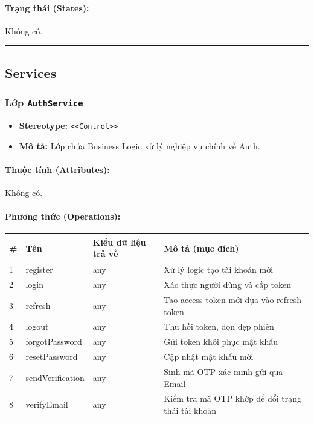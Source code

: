\documentclass[12pt,a4paper]{article}
\begin{document}
\paragraph{Trạng thái (States):}
Không có.

\vskip 0.5cm
\noindent\rule{\textwidth}{0.5pt}
\vskip 0.5cm

\subsection{Services}

\subsubsection{Lớp \texttt{AuthService}}
\begin{itemize}[leftmargin=*]
    \item \textbf{Stereotype:} \texttt{\textless{}\textless{}Control\textgreater{}\textgreater{}}
    \item \textbf{Mô tả:} Lớp chứa Business Logic xử lý nghiệp vụ chính về Auth.
\end{itemize}

\paragraph{Thuộc tính (Attributes):}
Không có.

\paragraph{Phương thức (Operations):}
\begin{longtable}{|p{0.6cm}|p{3.8cm}|p{2.6cm}|p{6.5cm}|}
\hline
\textbf{\#} & \textbf{Tên} & \textbf{Kiểu dữ liệu trả về} & \textbf{Mô tả (mục đích)} \\ \hline
\endhead
1 & register & any & Xử lý logic tạo tài khoản mới \\ \hline
2 & login & any & Xác thực người dùng và cấp token \\ \hline
3 & refresh & any & Tạo access token mới dựa vào refresh token \\ \hline
4 & logout & any & Thu hồi token, dọn dẹp phiên \\ \hline
5 & forgotPassword & any & Gửi token khôi phục mật khẩu \\ \hline
6 & resetPassword & any & Cập nhật mật khẩu mới \\ \hline
7 & sendVerification & any & Sinh mã OTP xác minh gửi qua Email \\ \hline
8 & verifyEmail & any & Kiểm tra mã OTP khớp để đổi trạng thái tài khoản \\ \hline
\end{longtable}
\end{document}

